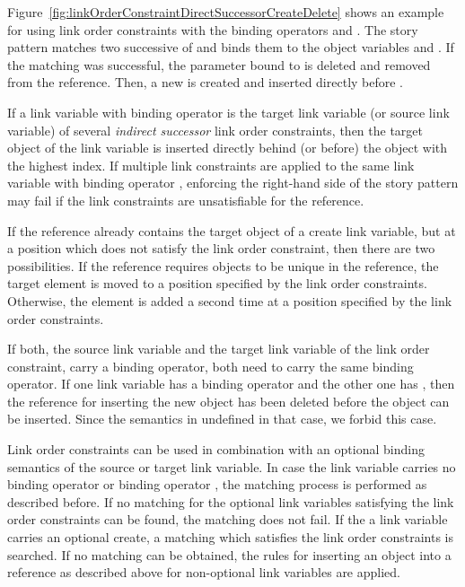 {Figure~\ref{fig:linkOrderConstraintDirectSuccessorCreateDelete} shows an example for using link order constraints with the binding operators \create and \destroy. The story pattern matches two successive  of  and binds them to the object variables  and . If the matching was successful, the parameter bound to  is deleted and removed from the reference. Then, a new  is created and inserted directly before .

If a link variable with binding operator \create is the target link variable (or source link variable) of several \emph{indirect successor} link order constraints, then the target object of the link variable is inserted directly behind (or before) the object with the highest index. If  multiple link constraints are applied to the same link variable with binding operator \create, enforcing the right-hand side of the story pattern may fail if the link constraints are unsatisfiable for the reference.

If the reference already contains the target object of a create link variable, but at a position which does not satisfy the link order constraint, then there are two possibilities.  If the reference requires objects to be unique in the reference, the target element is moved to a position specified by the link order constraints. Otherwise, the element is added a second time at a position specified by the link order constraints. 

If both, the source link variable and the target link variable of the link order constraint, carry a binding operator, both need to carry the same binding operator. If one link variable has a binding operator \create and the other one has \destroy, then the reference for inserting the new object has been deleted before the object can be inserted. Since the semantics in undefined in that case, we forbid this case.

Link order constraints can be used in combination with an optional binding semantics of the source or target link variable. In case the link variable carries no binding operator or binding operator \destroy, the matching process is performed as described before. If no matching for the optional link variables satisfying the link order constraints can be found, the matching does not fail. If the a link variable carries an optional create, a matching which satisfies the link order constraints is searched. If no matching can be obtained, the rules for inserting an object into a reference as described above for non-optional link variables are applied.

}
